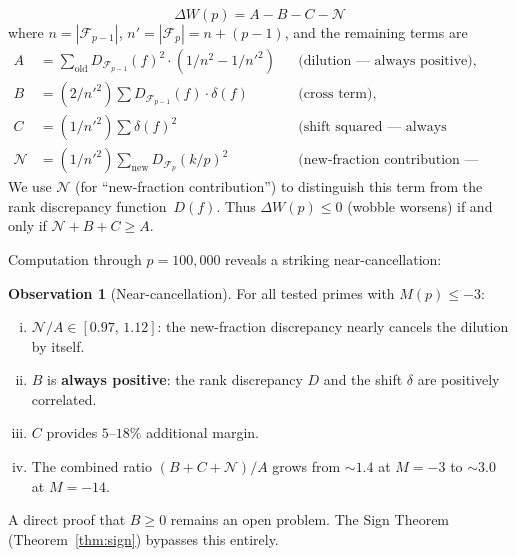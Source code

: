 \documentclass[11pt]{article}
\theoremstyle{definition}
\newtheorem{observation}[theorem]{Observation}
\newcommand{\F}{\mathcal{F}}
\begin{document}
\begin{equation}\label{eq:4term}
  \Delta W(p) = A - B - C - \mathcal{N}
\end{equation}
where $n = |\F_{p-1}|$, $n' = |\F_p| = n + (p-1)$, and the
remaining terms are
\begin{align*}
  A &= \textstyle\sum_{\text{old}} D_{\F_{p-1}}(f)^2 \cdot
       (1/n^2 - 1/{n'}^2) && \text{(dilution --- always positive),}\\
  B &= (2/{n'}^2)\textstyle\sum D_{\F_{p-1}}(f) \cdot \delta(f)
       && \text{(cross term),}\\
  C &= (1/{n'}^2)\textstyle\sum \delta(f)^2
       && \text{(shift squared --- always positive),}\\
  \mathcal{N} &= (1/{n'}^2)\textstyle\sum_{\text{new}} D_{\F_p}(k/p)^2
       && \text{(new-fraction contribution --- always positive).}
\end{align*}
We use $\mathcal{N}$ (for ``new-fraction contribution'') to
distinguish this term from the rank discrepancy function~$D(f)$.
Thus $\Delta W(p) \le 0$ (wobble worsens) if and only if
$\mathcal{N} + B + C \ge A$.

Computation through $p = 100{,}000$ reveals a striking near-cancellation:

\begin{observation}[Near-cancellation]\label{obs:near-cancel}
For all tested primes with $M(p) \le -3$:
\begin{enumerate}[(i)]
  \item $\mathcal{N}/A \in [0.97,\, 1.12]$: the new-fraction discrepancy nearly
    cancels the dilution by itself.
  \item $B$ is \textbf{always positive}: the rank discrepancy $D$ and
    the shift $\delta$ are positively correlated.
  \item $C$ provides $5$--$18\%$ additional margin.
  \item The combined ratio $(B + C + \mathcal{N})/A$ grows from ${\sim}1.4$ at
    $M = -3$ to ${\sim}3.0$ at $M = -14$.
\end{enumerate}
\end{observation}

\noindent A direct proof that $B \ge 0$ remains an open problem.
The Sign Theorem (Theorem~\ref{thm:sign}) bypasses
this entirely.
\end{document}
